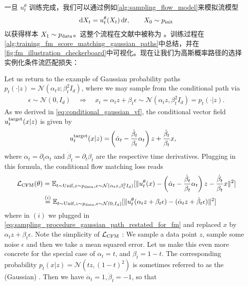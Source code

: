 一旦 $u_t^{\theta}$ 训练完成，我们可以通过例如\cref{alg:sampling_flow_model}来模拟流模型
\begin{align}
\label{eq:sde_extension_restated}
    \mathrm{d} X_t = u_t^\theta(X_t)\, \mathrm{d} t,\quad\quad X_0\sim p_{\rm{init}}
\end{align}
以获得样本 $X_1\sim p_{\rm{data}}$。这整个流程在文献中被称为 \citep{lipman2022flow, liu2022flow, albergo2023stochastic, lipman2024flow}。训练过程在\cref{alg:training_fm_score_matching_gaussian_paths}中总结，并在\cref{fig:fm_illustration_checkerboard}中可视化。现在让我们为高斯概率路径的选择实例化条件流匹配损失：
\begin{examplebox}
Let us return to the example of Gaussian probability paths $p_t(\cdot|z)=\mathcal{N}(\alpha_t z; \beta_t^2 I_d)$, where we may sample from the conditional path via
\begin{align}
\label{eq:sampling_procedure_gaussian_path_restated_for_fm}
    \epsilon\sim\mathcal{N}(0,I_d)\quad 
    \Rightarrow\quad x_t = \alpha_t z + \beta_t \epsilon \sim \mathcal{N}(\alpha_tz,\beta_t^2I_d)=p_t(\cdot|z).
\end{align}
As we derived in \cref{eq:conditional_gaussian_vf}, the conditional vector field $u^{\text{target}}_t(x|z)$ is given by
\begin{align}
\label{e:marginal_vf_cond_score}
    u^{\text{target}}_t(x|z) =& \left(\dot{\alpha}_t-\frac{\dot{\beta}_t}{\beta_t}\alpha_t\right)z+\frac{\dot{\beta}_t}{\beta_t}x,
\end{align}
where $\dot{\alpha}_t=\partial_t\alpha_t$ and $\dot{\beta}_t=\partial_t\beta_t$ are the respective time derivatives. Plugging in this formula, the conditional flow matching loss reads
\begin{align*}
\mathcal{L}_{\text{CFM}}(\theta) &= \mathbb{E}_{t\sim \text{Unif},z\sim p_{\rm{data}}, x\sim \mathcal{N}(\alpha_tz,\beta_t^2I_d)}[\lVert u_t^\theta(x)-\left(\dot{\alpha}_t-\frac{\dot{\beta}_t}{\beta_t}\alpha_t\right)z-\frac{\dot{\beta}_t}{\beta_t}x\rVert^2]\\&\overset{(i)}{=}\mathbb{E}_{t\sim\text{Unif},z\sim p_{\rm{data}}, \epsilon\sim \mathcal{N}(0,I_d)}[\|u_t^\theta(\alpha_tz+\beta_t\epsilon)-(\dot{\alpha}_tz+\dot{\beta}_t\epsilon)\|^2]
\end{align*}
where in $(i)$ we plugged in \cref{eq:sampling_procedure_gaussian_path_restated_for_fm} and replaced $x$ by $\alpha_tz+\beta_t\epsilon$. Note the simplicity of $\mathcal{L}_{\text{CFM}}$ : We sample a data point $z$, sample some noise $\epsilon$ and then we take a mean squared error. Let us make this even more concrete for the special case of $\alpha_t=t$, and $\beta_t=1-t$. The corresponding probability $p_t(x|z)=\mathcal{N}(tz,(1-t)^2)$ is sometimes referred to as the (Gaussian) . Then we have $\dot{\alpha}_t=1,\dot{\beta}_t=-1$, so that

\end{examplebox}
